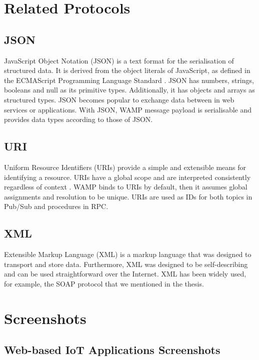 \chapter{Related Protocols}
\label{chapter:first-appendix}

\section{JSON}

JavaScript Object Notation (JSON) is a text format for the serialisation of structured data. It is derived from the object literals of JavaScript, as defined in the ECMAScript Programming Language Standard \cite{crockford2006application}. JSON has numbers, strings, booleans and null as its primitive types. Additionally, it has objects and arrays as structured types. JSON becomes popular to exchange data between in web services or applications. With JSON, WAMP message payload is serialisable and provides data types according to those of JSON. 

\section{URI}

Uniform Resource Identifiers (URIs) provide a simple and extensible means for identifying a resource. URIs have a global scope and are interpreted consistently regardless of context \cite{masinter2005uniform}. WAMP binds to URIs by default, then it assumes global assignments and resolution to be unique. URIs are used as IDs for both topics in Pub/Sub and procedures in RPC. 

\section{XML}
Extensible Markup Language (XML) is a markup language that was designed to transport and store data. Furthermore, XML was designed to be self-describing and can be used straightforward over the Internet. XML has been widely used, for example, the SOAP protocol that we mentioned in the thesis. 


\chapter{Screenshots}
\label{chapter:second-appendix}

\section{Web-based IoT Applications Screenshots}

